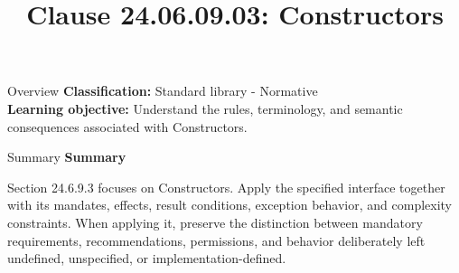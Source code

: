 \documentclass[10pt,letterpaper]{article}
\title{Clause 24.06.09.03: Constructors}
\author{}
\date{}
\begin{document}
\maketitle
\begin{CornellOverviewBox}{Overview}
\textbf{Classification:} Standard library - Normative\\[2pt]
\textbf{Learning objective:} Understand the rules, terminology, and semantic consequences associated with Constructors.
\end{CornellOverviewBox}\begin{CornellSummaryBox}{Summary}
{\sffamily\bfseries\color{Accent} Summary}\par\vspace{3pt}Section 24.6.9.3 focuses on Constructors. Apply the specified interface together with its mandates, effects, result conditions, exception behavior, and complexity constraints. When applying it, preserve the distinction between mandatory requirements, recommendations, permissions, and behavior deliberately left undefined, unspecified, or implementation-defined.
\end{CornellSummaryBox}
\end{document}
